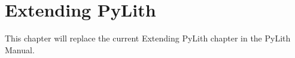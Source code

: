 \chapter{Extending PyLith}
\label{cha:developer}

This chapter will replace the current Extending PyLith chapter in the
PyLith Manual.




